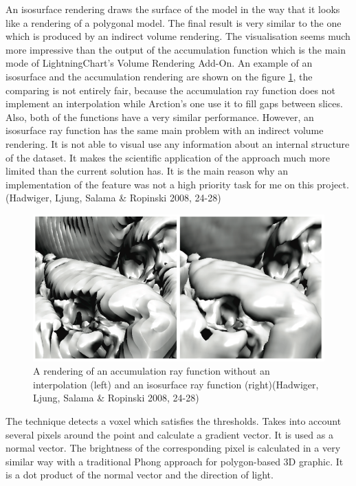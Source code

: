 \documentclass[twoside, english, 11pt]{report}
\begin{document}
An isosurface rendering draws the surface of the model in the way that it looks like a rendering of a polygonal model. The final result is very similar to the one which is produced by an indirect volume rendering. The visualisation seems much more impressive than the output of the accumulation function which is the main mode of LightningChart's Volume Rendering Add-On. An example of an isosurface and the accumulation rendering are shown on the figure \ref{fig:iso}, the comparing is not entirely fair, because the accumulation ray function does not implement an interpolation while Arction's one use it to fill gaps between slices. Also, both of the functions have a very similar performance. However, an isosurface ray function has the same main problem with an indirect volume rendering. It is not able to visual use any information about an internal structure of the dataset. It makes the scientific application of the approach much more limited than the current solution has. It is the main reason why an implementation of the feature was not a high priority task for me on this project.(Hadwiger, Ljung, Salama \& Ropinski 2008, 24-28)
\begin{figure}[H]
\centerline{\includegraphics[scale = 0.5]{img/iso}}
\caption{A rendering of an accumulation ray function without an interpolation (left) and an isosurface ray function (right)(Hadwiger, Ljung, Salama \& Ropinski 2008, 24-28)\label{fig:iso}}
\end{figure}

The technique detects a voxel which satisfies the thresholds. Takes into account several pixels around the point and calculate a gradient vector. It is used as a normal vector. The brightness of the corresponding pixel is calculated in a very similar way with a traditional Phong approach for polygon-based 3D graphic. It is a dot product of the normal vector and the direction of light.
\end{document}
